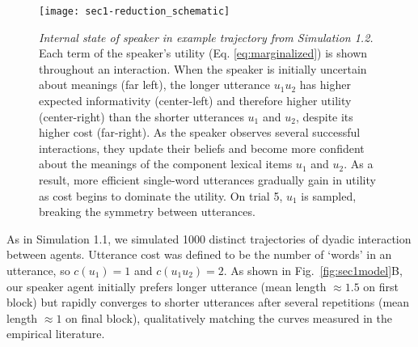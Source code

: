 \begin{figure*}[t]
\centering
    \texttt{[image: sec1-reduction\_schematic]}
  \caption{\emph{Internal state of speaker in example trajectory from Simulation 1.2.} Each term of the speaker's utility (Eq. \ref{eq:marginalized}) is shown throughout an interaction. When the speaker is initially uncertain about meanings (far left), the longer utterance $u_1u_2$ has higher expected informativity (center-left) and therefore higher utility (center-right) than the shorter utterances $u_1$ and $u_2$, despite its higher cost (far-right). As the speaker observes several successful interactions, they update their beliefs and become more confident about the meanings of the component lexical items $u_1$ and $u_2$. As a result, more efficient single-word utterances gradually gain in utility as cost begins to dominate the utility. On trial 5, $u_1$ is sampled, breaking the symmetry between utterances.}
  \label{fig:sec1internals}
\end{figure*}

As in Simulation 1.1, we simulated 1000 distinct trajectories of dyadic interaction between agents.
Utterance cost was defined to be the number of `words' in an utterance, so $c(u_1) =1$ and $c(u_1u_2)=2$.
As shown in Fig.~\ref{fig:sec1model}B, our speaker agent initially prefers longer utterance (mean length $\approx 1.5$ on first block) but rapidly converges to shorter utterances after several repetitions (mean length $\approx 1$ on final block), qualitatively matching the curves measured in the empirical literature.


